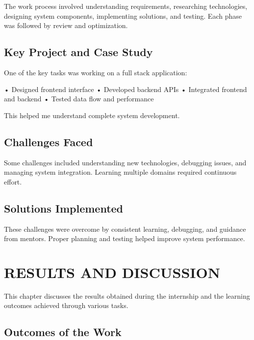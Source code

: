\documentclass[12pt,a4paper]{report}
\begin{document}
The work process involved understanding requirements, researching technologies, designing system components, implementing solutions, and testing. Each phase was followed by review and optimization.


\section{Key Project and Case Study}

One of the key tasks was working on a full stack application:


• Designed frontend interface • Developed backend APIs • Integrated frontend and backend • Tested data flow and performance


This helped me understand complete system development.




\section{Challenges Faced}

Some challenges included understanding new technologies, debugging issues, and managing system integration. Learning multiple domains required continuous effort.


\section{Solutions Implemented}

These challenges were overcome by consistent learning, debugging, and guidance from mentors. Proper planning and testing helped improve system performance.


\chapter{RESULTS AND DISCUSSION}
\label{ch:results}


This chapter discusses the results obtained during the internship and the learning outcomes achieved through various tasks.




\section{Outcomes of the Work}
\end{document}
